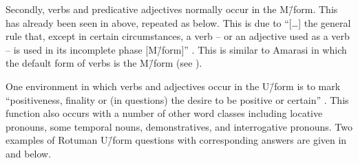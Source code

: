 Secondly, verbs and predicative adjectives normally occur in the M\=/form.
This has already been seen in  above, repeated as  below.
This is due to ``[\ldots] the general rule that, except in certain circumstances, a verb
-- or an adjective used as a verb -- is used in its incomplete phase [M\=/form]'' \citep[15]{ch40}.
This is similar to Amarasi in which the default form of verbs is the M\=/form
(see ).

\begin{exe}\let\eachwordone=\itshape
	\label{ex2:ThePeoAre}
\end{exe}

One environment in which verbs and adjectives occur in the U\=/form is to mark
``positiveness, finality or (in questions) the desire to be positive or certain'' \citep[88]{ch40}.
This function also occurs with a number of other word classes including
locative pronouns, some temporal nouns, demonstratives, and interrogative pronouns.
Two examples of Rotuman U\=/form questions with corresponding answers
are given in  and  below.

\begin{multicols}{2}
	\begin{exe}\let\eachwordone=\itshape
		\label{ex:RotQA1}
	\end{exe}
\end{multicols}
\begin{multicols}{2}
	\begin{exe}\let\eachwordone=\itshape
		\label{ex:RotQA2}
	\end{exe}
\end{multicols}

